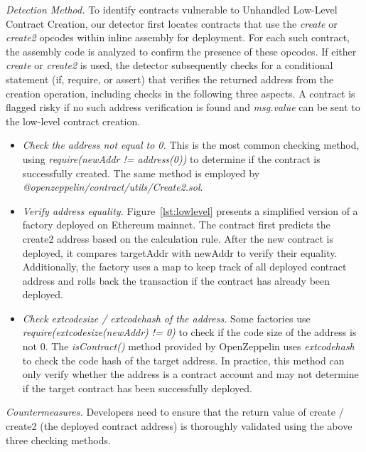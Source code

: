 \documentclass[acmsmall,screen]{acmart}
\begin{document}
	\textit{Detection Method.} To identify contracts vulnerable to Unhandled Low-Level Contract Creation, our detector first locates contracts that use the \textit{create} or \textit{create2} opcodes within inline assembly for deployment. For each such contract, the assembly code is analyzed to confirm the presence of these opcodes. If either \textit{create} or \textit{create2} is used, the detector subsequently checks for a conditional statement (if, require, or assert) that verifies the returned address from the creation operation, including checks in the following three aspects. A contract is flagged risky if no such address verification is found and \textit{msg.value} can be sent to the low-level contract creation.
	\begin{itemize}[leftmargin=0.4cm,topsep=0.1cm]
		\item \textit{Check the address not equal to 0.} This is the most common checking method, using \textit{require(newAddr != address(0))} to determine if the contract is successfully created. The same method is employed by \textit{@openzeppelin/contract/utils/Create2.sol}.
		\item \textit{Verify address equality.} Figure~\ref{lst:lowlevel} presents a simplified version of a factory deployed on Ethereum mainnet. The contract first predicts the create2 address based on the calculation rule. After the new contract is deployed, it compares targetAddr with newAddr to verify their equality. Additionally, the factory uses a map to keep track of all deployed contract address and rolls back the transaction if the contract has already been deployed.
		\item \textit{Check extcodesize / extcodehash of the address.} Some factories use \textit{require(extcodesize(newAddr) != 0)} to check if the code size of the address is not 0. The \textit{isContract()} method provided by OpenZeppelin uses \textit{extcodehash} to check the code hash of the target address. In practice, this method can only verify whether the address is a contract account and may not determine if the target contract has been successfully deployed.
	\end{itemize}

	\textit{Countermeasures.} Developers need to ensure that the return value of create / create2 (the deployed contract address) is thoroughly validated using the above three checking methods.
\end{document}
